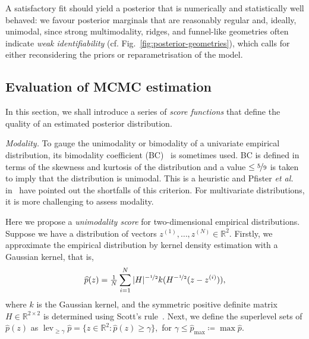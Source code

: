 \documentclass[11pt]{report}
\newcommand{\R}{\mathbb{R}}
\begin{document}
A satisfactory fit should yield a posterior that is numerically and 
statistically well behaved: we favour posterior marginals that are 
reasonably regular and, ideally, unimodal, since strong multimodality, 
ridges, and funnel-like geometries often indicate \textit{weak identifiability}
(cf. Fig.~\ref{fig:posterior-geometries}), 
which calls for either reconsidering the priors or reparametrisation 
of the model.


\subsection{Evaluation of MCMC estimation}\label{sec:mcmc_evaluation}

In this section, we shall introduce a series of 
\textit{score functions} that define the quality of an estimated 
posterior distribution.


\textit{Modality.} 
To gauge the unimodality or bimodality of a univariate empirical 
distribution, its bimodality coefficient (BC)~\cite{Pfister2013}
is sometimes used. BC is defined in terms of the skewness and kurtosis 
of the distribution and a value $\leq\nicefrac{5}{9}$ is taken 
to imply that the distribution is unimodal.
This is a heuristic and Pfister \textit{et al.} in~\cite{Pfister2013}
have pointed out the shortfalls of this criterion.
For multivariate distributions, it is more challenging to 
assess modality.


Here we propose a \textit{unimodality score} for two-dimensional 
empirical distributions. Suppose we have a distribution of 
vectors $z^{(1)}, \ldots, z^{(N)} \in \R^2$. Firstly, we approximate 
the empirical distribution by kernel density estimation with a 
Gaussian kernel, that is,
\begin{equation}
    \widehat{p}(z) 
    {}={} 
    \tfrac{1}{N}
    \sum_{i=1}^{N} 
        |H|^{-\nicefrac{1}{2}}
        k(H^{-\nicefrac{1}{2}} (z - z^{(i)})),
\end{equation}
where $k$ is the Gaussian kernel, and the symmetric positive 
definite matrix $H \in \R^{2\times 2}$
is determined using Scott's rule~\cite{Scott1992book}.
Next, we define the superlevel sets of $\widehat{p}(z)$ as 
\(
    \operatorname{lev}_{\geq \gamma} \widehat{p} 
    {}={}
    \{z\in \R^2 {}:{} \widehat{p}(z)  \geq \gamma\},
\)
for $\gamma \leq \widehat{p}_{\max} \coloneqq \max \widehat{p}$.
\end{document}

